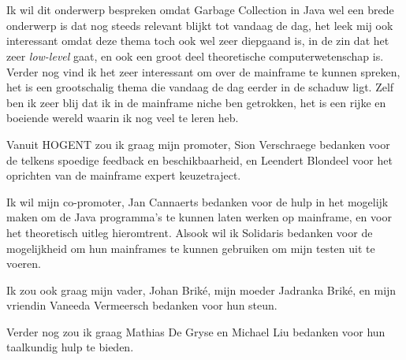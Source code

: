 
\chapter*{}%
\label{ch:voorwoord}




Ik wil dit onderwerp bespreken omdat Garbage Collection in Java wel een brede onderwerp is dat nog steeds relevant blijkt tot vandaag de dag, het leek mij ook interessant omdat deze thema toch ook wel zeer diepgaand is, in de zin dat het zeer \textit{low-level} gaat, en ook een groot deel theoretische computerwetenschap is.
Verder nog vind ik het zeer interessant om over de mainframe te kunnen spreken, het is een grootschalig thema die vandaag de dag eerder in de schaduw ligt.
Zelf ben ik zeer blij dat ik in de mainframe niche ben getrokken, het is een rijke en boeiende wereld waarin ik nog veel te leren heb.



Vanuit HOGENT zou ik graag mijn promoter, Sion Verschraege bedanken voor de telkens spoedige feedback en beschikbaarheid, en Leendert Blondeel voor het oprichten van de mainframe expert keuzetraject.


Ik wil mijn co-promoter, Jan Cannaerts bedanken voor de hulp in het mogelijk maken om de Java programma's te kunnen laten werken op mainframe, en voor het theoretisch uitleg hieromtrent.
Alsook wil ik Solidaris bedanken voor de mogelijkheid om hun mainframes te kunnen gebruiken om mijn testen uit te voeren.


Ik zou ook graag mijn vader, Johan Briké, mijn moeder Jadranka Briké, en mijn vriendin Vaneeda Vermeersch bedanken voor hun steun.

Verder nog zou ik graag Mathias De Gryse en Michael Liu bedanken voor hun taalkundig hulp te bieden.


